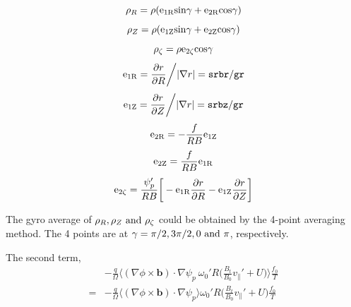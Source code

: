 \documentclass[12pt]{article}
\begin{document}
\begin{CJK*}{UTF8}{gbsn}
\begin{equation*}
    \rho_R = \rho({\rm e_{1R}sin}\gamma + {\rm e_{2R}cos}\gamma)
\end{equation*}
\begin{equation*}
    \rho_Z = \rho({\rm e_{1Z}sin}\gamma + {\rm e_{2Z}cos}\gamma)
\end{equation*}
\begin{equation*}
    \rho_\zeta = \rho{\rm e_{2\zeta}cos}\gamma
\end{equation*}
\begin{equation*}
    {\rm e_{1R}} = \frac{\partial r}{\partial R}\bigg/|\nabla r| = {\tt srbr/gr}
\end{equation*}
\begin{equation*}
    {\rm e_{1Z}} = \frac{\partial r}{\partial Z}\bigg/|\nabla r| = {\tt srbz/gr}
\end{equation*}
\begin{equation*}
    {\rm e_{2R}} = -\frac{f}{RB}{\rm e_{1Z}} 
\end{equation*}
\begin{equation*}
    {\rm e_{2Z}} = \frac{f}{RB}{\rm e_{1R}} 
\end{equation*}
\begin{equation*}
    {\rm e_{2\zeta}} = \frac{\psi_p'}{RB}\bigg[-{\rm e_{1R}}\frac{\partial r}{\partial R} - {\rm e_{1Z}}\frac{\partial r}{\partial Z}\bigg] 
\end{equation*}

The gyro average of $\rho_R, \rho_Z {\rm \ and\ } \rho_\zeta$ could be obtained by the 4-point averaging method.
The 4 points are at $\gamma=\pi/2,3\pi/2,0 {\rm \ and\ }\pi$, respectively.

The second term,
\begin{equation}
\begin{split}
    &-\frac{q}{\Omega}\bigg\langle(\nabla\phi\times\mathbf{b})\cdot\nabla\psi_p\ \omega_0'R\bigg(\frac{B_t}{B_0}v_\parallel'+U\bigg)\bigg\rangle\frac{f_0}{T}\\
    =&-\frac{q}{\Omega}\bigg\langle(\nabla\phi\times\mathbf{b})\cdot\nabla\psi_p\bigg\rangle\omega_0'R\bigg(\frac{B_t}{B_0}v_\parallel'+U\bigg)\frac{f_0}{T}\label{t2}
\end{split}
\end{equation}


\end{CJK*}
\end{document}
